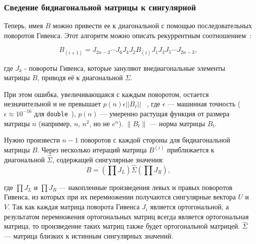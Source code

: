 \subsubsection{Сведение бидиагональной матрицы к сингулярной}

Теперь, имея $B$ можно привести ее к диагональной с помощью последовательных поворотов Гивенса. Этот алгоритм можно описать рекуррентным соотношением~\cite{Demmel1990}:

\begin{equation}
B_{(i+1)} = J_{2n-2} \cdots J_6 J_4 J_2 B_{(i)} J_1 J_3 J_5 \cdots J_{2n-3},
\end{equation}

где \( J_k \) - повороты Гивенса, которые зануляют внедиагональные элементы матрицы \( B \), приводя её к диагональной \( \Sigma \). 

При этом ошибка, увеличивающаяся с каждым поворотом, остается незначительной и не превышает $p(n) \epsilon ||B_\ell||$ ~\cite{Demmel1990}, где  \( \epsilon \) — машинная точность (\( \epsilon \approx 10^{-16} \) для \texttt{double}~\cite{Golub2013}), \( p(n) \) — умеренно растущая функция от размера матрицы \( n \) (например, \( n \), \( n^2 \), но не \( e^n \)). \( \|B_t\| \) — норма матрицы \( B_t \).

Нужно произвести \( n-1 \) поворотов с каждой стороны для бидиагональной матрицы \( B \). Через несколько итераций матрица \( B^{(i)} \) приближается к диагональной \( \widehat{\Sigma} \), содержащей сингулярные значения:
\begin{equation}
B = \left( \prod J_L \right) \widehat{\Sigma} \left( \prod J_R \right),
\end{equation}

где \( \prod J_L \) и \( \prod J_R \) — накопленные произведения левых и правых поворотов Гивенса, из которых при их перемножении получаются сингулярные вектора \( U \) и \( V \). Так как каждая матрица поворота Гивенса $J_i$ является ортогональной, а результатом перемножения ортогональных матриц всегда является ортогональная матрица, то произведение таких матриц также будет ортогональной матрицей. $\widehat{\Sigma}$ — матрица близких к истинным сингулярных значений.

